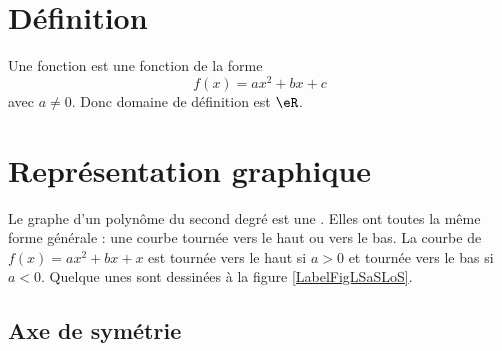 


\section{Définition}

\begin{definition}
    Une fonction  est une fonction de la forme
    \begin{equation}
        f(x)=ax^2+bx+c
    \end{equation}
    avec \( a\neq 0\). Donc domaine de définition est \( \eR\).
\end{definition}

\section{Représentation graphique}

\newcommand{\CaptionFigLSaSLoS}{Quelque paraboles.}


Le graphe d'un polynôme du second degré est une . Elles ont toutes la même forme générale : une courbe tournée vers le haut ou vers le bas. La courbe de \( f(x)=ax^2+bx+x\) est tournée vers le haut si \( a>0\) et tournée vers le bas si \( a<0\).
Quelque unes sont dessinées à la figure \ref{LabelFigLSaSLoS}. %



\subsection{Axe de symétrie}

